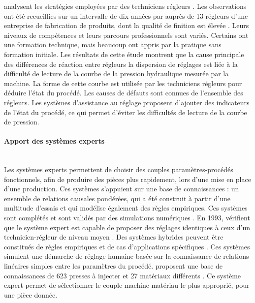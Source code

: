 \citeauthor{richard_analyse_2009} analysent les stratégies employées par des techniciens régleurs \cite{richard_analyse_2009}.
Les observations ont été recueillies sur un intervalle de dix années par \citeauthor{pastre_role_2004} \cite{pastre_role_1994, pastre_role_2004} auprès de 13 régleurs d’une entreprise de fabrication de produits, dont la qualité de finition est élevée \cite{pastre_role_1994, pastre_role_2004}.
Leurs niveaux de compétences et leurs parcours professionnels sont variés.
Certains ont une formation technique, mais beaucoup ont appris par la pratique sans formation initiale.
Les résultats de cette étude montrent que la cause principale des différences de réaction entre régleurs \textemdash la dispersion de réglages \textemdash est liée à la difficulté de lecture de la courbe de la pression hydraulique mesurée par la machine.
La forme de cette courbe est utilisée par les techniciens régleurs pour déduire l’état du procédé.
Les causes de défauts sont connues de l’ensemble des régleurs.
Les systèmes d'assistance au réglage proposent d'ajouter des indicateurs de l’état du procédé, ce qui permet d'éviter les difficultés de lecture de la courbe de pression.

\paragraph{Apport des systèmes experts}\mbox{} \\
Les systèmes experts permettent de choisir des couples paramètres-procédés fonctionnels, afin de produire des pièces plus rapidement, lors d'une mise en place d'une production.
Ces systèmes s’appuient sur une base de connaissances : un ensemble de relations causales pondérées, qui a été construit à partir d'une multitude d'essais et qui modélise également des règles empiriques.
Ces systèmes sont complétés et sont validés par des simulations numériques \cite{jan_expert_1992}.
En 1993, \citeauthor{kameoka_development_1993} vérifient que le système expert est capable de proposer des réglages identiques à ceux d’un technicien-régleur de niveau moyen \cite{kameoka_development_1993}.
Des systèmes hybrides peuvent être constitués de règles empiriques et de cas d'applications spécifiques \cite{shelesh-nezhad_intelligent_1997}.
Ces systèmes simulent une démarche de réglage humaine basée sur la connaissance de relations linéaires simples entre les paramètres du procédé.
\citeauthor{bozdana_development_2002} proposent une base de connaissances de 623 presses à injecter et 27 matériaux différents \cite{bozdana_development_2002}.
Ce système expert permet de sélectionner le couple machine-matériau le plus approprié, pour une pièce donnée.

